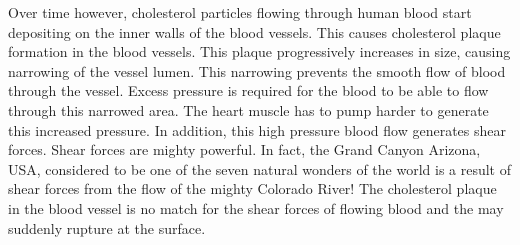 {Over time however, cholesterol particles flowing through human blood start depositing on the inner walls of the blood vessels. This causes cholesterol plaque formation in the blood vessels. This plaque progressively increases in size, causing narrowing of the vessel lumen. This narrowing prevents the smooth flow of blood through the vessel. Excess pressure is required for the blood to be able to flow through this narrowed area. The heart muscle has to pump harder to generate this increased pressure. In addition, this high pressure blood flow generates shear forces. Shear forces are mighty powerful. In fact, the Grand Canyon Arizona, USA, considered to be one of the seven natural wonders of the world is a result of shear forces from the flow of the mighty Colorado River! The cholesterol plaque in the blood vessel is no match for the shear forces of flowing blood and the may suddenly rupture at the surface.

}
